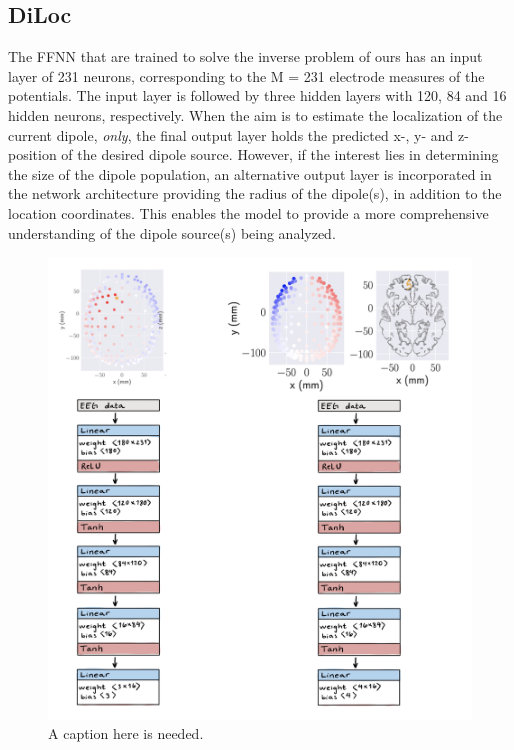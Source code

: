 \documentclass[a4paper, UKenglish, 11pt]{uiomaster}
\begin{document}
\subsection{DiLoc}
The FFNN that are trained to solve the inverse problem of ours has an input layer of 231 neurons, corresponding to the M = 231 electrode measures of the potentials. The input layer is followed by three hidden layers with 120, 84 and 16 hidden neurons, respectively. When the aim is to estimate the localization of the current dipole, \emph{only}, the final output layer holds the predicted x-, y- and z- position of the desired dipole source.  However, if the interest lies in determining the size of the dipole population, an alternative output layer is incorporated in the network architecture providing the radius of the dipole(s), in addition to the location coordinates. This enables the model to provide a more comprehensive understanding of the dipole source(s) being analyzed.

\begin{figure}
  \includegraphics[width=\linewidth]{figures/NN_architecture.png}
  \caption{A caption here is needed.}
  \label{fig:NN_architecture.png}
\end{figure}
\end{document}
